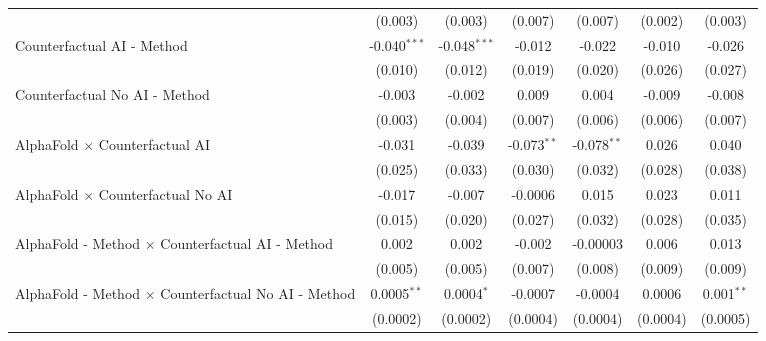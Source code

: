 \begin{tabular}{lcccccc}
                                                              & (0.003)        & (0.003)        & (0.007)       & (0.007)       & (0.002)        & (0.003)\\   
   Counterfactual AI - Method                                 & -0.040$^{***}$ & -0.048$^{***}$ & -0.012        & -0.022        & -0.010         & -0.026\\   
                                                              & (0.010)        & (0.012)        & (0.019)       & (0.020)       & (0.026)        & (0.027)\\   
   Counterfactual No AI - Method                              & -0.003         & -0.002         & 0.009         & 0.004         & -0.009         & -0.008\\   
                                                              & (0.003)        & (0.004)        & (0.007)       & (0.006)       & (0.006)        & (0.007)\\   
   AlphaFold $\times$ Counterfactual AI                       & -0.031         & -0.039         & -0.073$^{**}$ & -0.078$^{**}$ & 0.026          & 0.040\\   
                                                              & (0.025)        & (0.033)        & (0.030)       & (0.032)       & (0.028)        & (0.038)\\   
   AlphaFold $\times$ Counterfactual No AI                    & -0.017         & -0.007         & -0.0006       & 0.015         & 0.023          & 0.011\\   
                                                              & (0.015)        & (0.020)        & (0.027)       & (0.032)       & (0.028)        & (0.035)\\   
   AlphaFold - Method $\times$ Counterfactual AI - Method     & 0.002          & 0.002          & -0.002        & -0.00003      & 0.006          & 0.013\\   
                                                              & (0.005)        & (0.005)        & (0.007)       & (0.008)       & (0.009)        & (0.009)\\   
   AlphaFold - Method $\times$ Counterfactual No AI - Method  & 0.0005$^{**}$  & 0.0004$^{*}$   & -0.0007       & -0.0004       & 0.0006         & 0.001$^{**}$\\   
                                                              & (0.0002)       & (0.0002)       & (0.0004)      & (0.0004)      & (0.0004)       & (0.0005)\\   
   \midrule

\end{tabular}
